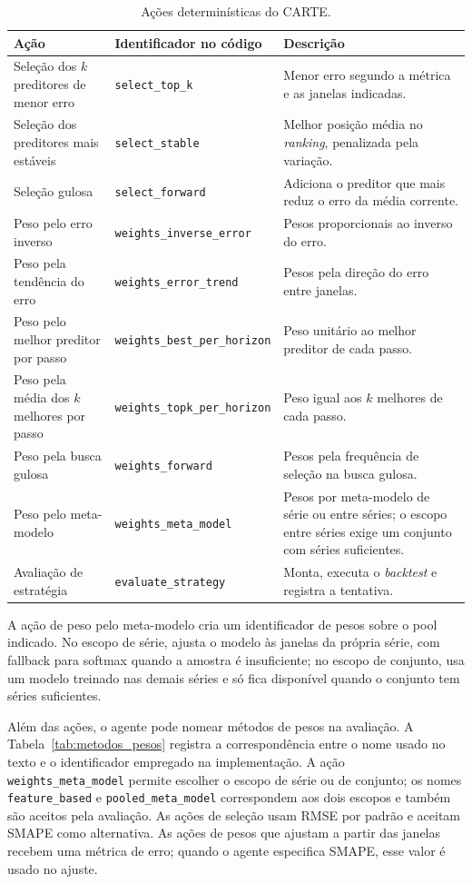 \begin{table}[H]
\small
\centering
\caption{Ações determinísticas do CARTE.}
\label{tab:acoes_carte}
\begin{tabular}{@{}p{3.8cm}p{5.6cm}p{4.6cm}@{}}
\toprule
\textbf{Ação} & \textbf{Identificador no código} & \textbf{Descrição} \\
\midrule
Seleção dos $k$ preditores de menor erro & \texttt{select\_top\_k} & Menor erro segundo a métrica e as janelas indicadas. \\
Seleção dos preditores mais estáveis & \texttt{select\_stable} & Melhor posição média no \textit{ranking}, penalizada pela variação. \\
Seleção gulosa & \texttt{select\_forward} & Adiciona o preditor que mais reduz o erro da média corrente. \\
Peso pelo erro inverso & \texttt{weights\_inverse\_error} & Pesos proporcionais ao inverso do erro. \\
Peso pela tendência do erro & \texttt{weights\_error\_trend} & Pesos pela direção do erro entre janelas. \\
Peso pelo melhor preditor por passo & \texttt{weights\_best\_per\_horizon} & Peso unitário ao melhor preditor de cada passo. \\
Peso pela média dos $k$ melhores por passo & \texttt{weights\_topk\_per\_horizon} & Peso igual aos $k$ melhores de cada passo. \\
Peso pela busca gulosa & \texttt{weights\_forward} & Pesos pela frequência de seleção na busca gulosa. \\
Peso pelo meta-modelo & \texttt{weights\_meta\_model} & Pesos por meta-modelo de série ou entre séries; o escopo entre séries exige um conjunto com séries suficientes. \\
Avaliação de estratégia & \texttt{evaluate\_strategy} & Monta, executa o \textit{backtest} e registra a tentativa. \\
\bottomrule
\end{tabular}
\end{table}

A ação de peso pelo meta-modelo cria um identificador de pesos sobre o pool indicado. No escopo de série, ajusta o modelo às janelas da própria série, com fallback para softmax quando a amostra é insuficiente; no escopo de conjunto, usa um modelo treinado nas demais séries e só fica disponível quando o conjunto tem séries suficientes.

Além das ações, o agente pode nomear métodos de pesos na avaliação. A Tabela~\ref{tab:metodos_pesos} registra a correspondência entre o nome usado no texto e o identificador empregado na implementação. A ação \texttt{weights\_meta\_model} permite escolher o escopo de série ou de conjunto; os nomes \texttt{feature\_based} e \texttt{pooled\_meta\_model} correspondem aos dois escopos e também são aceitos pela avaliação. As ações de seleção usam RMSE por padrão e aceitam SMAPE como alternativa. As ações de pesos que ajustam a partir das janelas recebem uma métrica de erro; quando o agente especifica SMAPE, esse valor é usado no ajuste.

